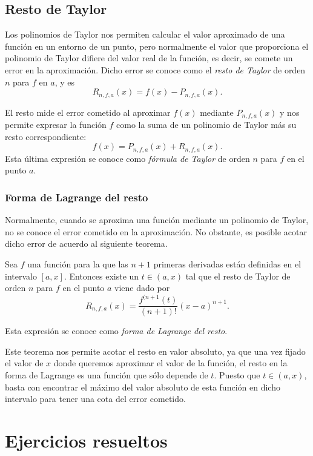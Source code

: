 \subsection{Resto de Taylor}
Los polinomios de Taylor nos permiten calcular el valor aproximado de una función en un entorno de un punto, pero normalmente el valor que proporciona el polinomio de Taylor difiere del valor real de la función, es decir, se comete un error en la aproximación. Dicho error se conoce como el \emph{resto de Taylor} de orden $n$ para $f$ en $a$, y es
\[
R_{n,f,a}(x)=f(x)-P_{n,f,a}(x).
\]

El resto mide el error cometido al aproximar $f(x)$ mediante $P_{n,f,a}(x)$ y nos permite expresar la función $f$ como la suma de un polinomio de Taylor más su resto correspondiente:
\[
f(x)=P_{n,f,a}(x)+R_{n,f,a}(x).
\]
Esta última expresión se conoce como \emph{fórmula de Taylor} de orden $n$ para $f$ en el punto $a$.

\subsubsection*{Forma de Lagrange del resto}
Normalmente, cuando se aproxima una función mediante un polinomio de Taylor, no se conoce el error cometido en la aproximación. No obstante, es posible acotar dicho error de acuerdo al siguiente teorema.

\begin{teorema}
Sea $f$ una función para la que las $n+1$ primeras derivadas están definidas en el intervalo $[a,x]$. Entonces existe un $t\in(a,x)$ tal que el resto de Taylor de orden $n$ para $f$ en el punto $a$ viene dado por
\[
R_{n,f,a}(x)=\frac{f^{(n+1}(t)}{(n+1)!}(x-a)^{n+1}.
\]
\end{teorema}
Esta expresión se conoce como \emph{forma de Lagrange del resto}.


Este teorema nos permite acotar el resto en valor absoluto, ya que una vez fijado el valor de $x$ donde queremos aproximar el valor de la función, el resto en la forma de Lagrange es una función que sólo depende de $t$. Puesto que $t\in (a,x)$, basta con encontrar el máximo del valor absoluto de esta función en dicho intervalo para tener una cota del error cometido.

\newpage

\section{Ejercicios resueltos}

